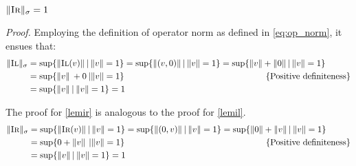 \begin{lemma} \label{lemir}
  $ \lVert \textsc{Ir} \rVert_{\sigma} = 1   $
\end{lemma} 

\textit{Proof.} \quad Employing the definition of operator norm as defined in \autoref{eq:op_norm}, it ensues that:
\begin{equation} 
\begin{split}
  \lVert \textsc{Il} \rVert_{\sigma} &= \text{sup} \{\lVert \textsc{Il} (v) \rVert \hspace{2pt} \vert \hspace{2pt}  \lVert v\rVert =1 \} = \text{sup} \{\lVert (v,0) \rVert \hspace{2pt} \vert \hspace{2pt}  \lVert v\rVert =1 \} = \text{sup} \{\lVert v \rVert + \lVert 0 \rVert  \hspace{2pt} \vert \hspace{2pt}  \lVert v\rVert =1 \} \\
  & = \text{sup} \{\lVert v \rVert \hspace{2pt} + 0    \hspace{2pt}  \vert \lVert v\rVert =1 \} \hspace{160 pt} \text{ \{Positive definiteness\}} \\
  & = \text{sup} \{\lVert v \rVert \hspace{2pt} \vert \hspace{2pt}  \lVert v\rVert =1 \} = 1
\end{split}
\end{equation}

The proof for \autoref{lemir} is analogous to the proof for \autoref{lemil}.
\begin{equation} 
  \begin{split}
    \lVert \textsc{Ir} \rVert_{\sigma} &= \text{sup} \{\lVert \textsc{Ir} (v) \rVert \hspace{2pt} \vert \hspace{2pt}  \lVert v\rVert =1 \} = \text{sup} \{\lVert (0,v) \rVert \hspace{2pt} \vert \hspace{2pt}  \lVert v\rVert =1 \} = \text{sup} \{ \lVert 0 \rVert +\lVert v \rVert   \hspace{2pt} \vert \hspace{2pt}  \lVert v\rVert =1 \} \\
    & = \text{sup} \{0+\lVert v \rVert \hspace{2pt}     \hspace{2pt}  \vert \lVert v\rVert =1 \} \hspace{160 pt} \text{ \{Positive definiteness\}} \\
    & = \text{sup} \{\lVert v \rVert \hspace{2pt} \vert \hspace{2pt}  \lVert v\rVert =1 \} = 1
  \end{split}
  \end{equation}

